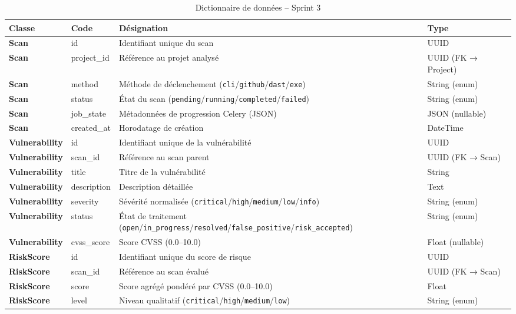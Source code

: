 \begin{table}[H]
\centering
\caption{Dictionnaire de données -- Sprint 3}
\label{tab:dict-sprint3}
\small
\renewcommand{\arraystretch}{1.3}
\begin{tabularx}{\textwidth}{>{\bfseries}p{2.8cm} p{3cm} X p{2.5cm}}
\hline
\rowcolor{gray!15}
\textbf{Classe} & \textbf{Code} & \textbf{Désignation} & \textbf{Type} \\
\hline
Scan & id & Identifiant unique du scan & UUID \\
Scan & project\_id & Référence au projet analysé & UUID (FK → Project) \\
Scan & method & Méthode de déclenchement (\texttt{cli}/\texttt{github}/\texttt{dast}/\texttt{exe}) & String (enum) \\
Scan & status & État du scan (\texttt{pending}/\texttt{running}/\texttt{completed}/\texttt{failed}) & String (enum) \\
Scan & job\_state & Métadonnées de progression Celery (JSON) & JSON (nullable) \\
Scan & created\_at & Horodatage de création & DateTime \\
\hline
Vulnerability & id & Identifiant unique de la vulnérabilité & UUID \\
Vulnerability & scan\_id & Référence au scan parent & UUID (FK → Scan) \\
Vulnerability & title & Titre de la vulnérabilité & String \\
Vulnerability & description & Description détaillée & Text \\
Vulnerability & severity & Sévérité normalisée (\texttt{critical}/\texttt{high}/\texttt{medium}/\texttt{low}/\texttt{info}) & String (enum) \\
Vulnerability & status & État de traitement (\texttt{open}/\texttt{in\_progress}/\texttt{resolved}/\texttt{false\_positive}/\texttt{risk\_accepted}) & String (enum) \\
Vulnerability & cvss\_score & Score CVSS (0.0--10.0) & Float (nullable) \\
\hline
RiskScore & id & Identifiant unique du score de risque & UUID \\
RiskScore & scan\_id & Référence au scan évalué & UUID (FK → Scan) \\
RiskScore & score & Score agrégé pondéré par CVSS (0.0--10.0) & Float \\
RiskScore & level & Niveau qualitatif (\texttt{critical}/\texttt{high}/\texttt{medium}/\texttt{low}) & String (enum) \\
\hline
\end{tabularx}
\end{table}

